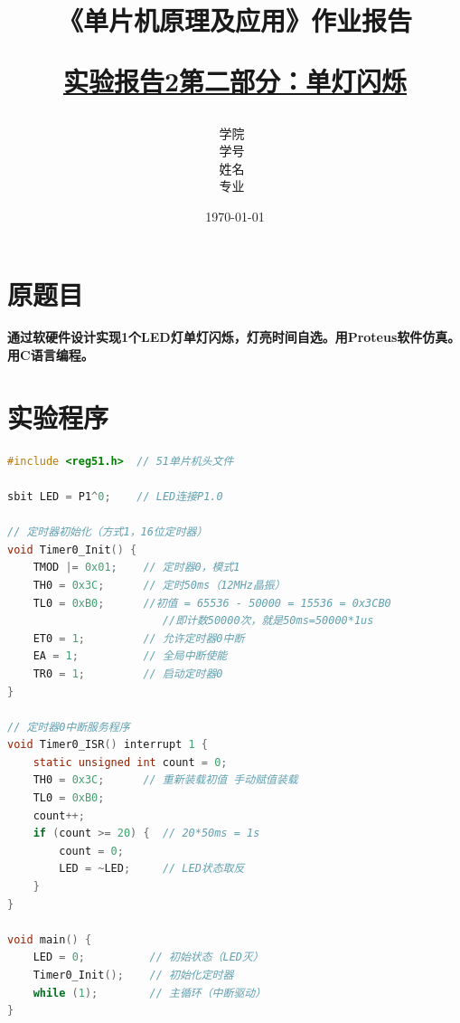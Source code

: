 \documentclass[12pt,hyperref,a4paper,UTF8]{ctexart}
\title{ 
        \vspace{1cm}
        \heiti \Huge \textbf{《单片机原理及应用》作业报告} \par
        \vspace{1cm} 
        \heiti \Large {\underline{实验报告2第二部分：单灯闪烁}   } 
        \vspace{3cm}
    
    }
\author{
        \vspace{0.5cm}
        \kaishu\Large 学院\ \dlmu[9cm]{卓越学院} \\ %
        \vspace{0.5cm}
        \kaishu\Large 学号\ \dlmu[9cm]{23040447} \\ %
        \vspace{0.5cm}
        \kaishu\Large 姓名\ \dlmu[9cm]{陈文轩} \qquad  \\ %
        \vspace{0.5cm}
        \kaishu\Large 专业\ \dlmu[9cm]{智能硬件与系统(电子信息工程)} \qquad \\ %
    }
\date{\today} %
\begin{document}
\cover
\thispagestyle{empty} %







\newpage
\setcounter{page}{1} %


\section{原题目}

\textbf{通过软硬件设计实现1个LED灯单灯闪烁，灯亮时间自选。用Proteus软件仿真。用C语言编程。}

\section{实验程序}
\begin{lstlisting}[language=C, caption={数据迁移实验程序}]
#include <reg51.h>  // 51单片机头文件

sbit LED = P1^0;    // LED连接P1.0

// 定时器初始化（方式1，16位定时器）
void Timer0_Init() {
    TMOD |= 0x01;    // 定时器0，模式1
    TH0 = 0x3C;      // 定时50ms（12MHz晶振）
    TL0 = 0xB0;      //初值 = 65536 - 50000 = 15536 = 0x3CB0 
                        //即计数50000次，就是50ms=50000*1us
    ET0 = 1;         // 允许定时器0中断
    EA = 1;          // 全局中断使能
    TR0 = 1;         // 启动定时器0
}

// 定时器0中断服务程序
void Timer0_ISR() interrupt 1 {
    static unsigned int count = 0;
    TH0 = 0x3C;      // 重新装载初值 手动赋值装载
    TL0 = 0xB0;
    count++;
    if (count >= 20) {  // 20*50ms = 1s
        count = 0;
        LED = ~LED;     // LED状态取反
    }
}

void main() {
    LED = 0;          // 初始状态（LED灭）
    Timer0_Init();    // 初始化定时器
    while (1);        // 主循环（中断驱动）
}
    
\end{lstlisting}
\end{document}
